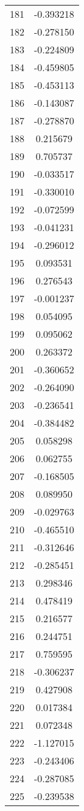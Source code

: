 \documentclass[12pt]{article}
\begin{document}
\begin{longtable}{@{}cc@{}}
181 & -0.393218 \\
182 & -0.278150 \\
183 & -0.224809 \\
184 & -0.459805 \\
185 & -0.453113 \\
186 & -0.143087 \\
187 & -0.278870 \\
188 & 0.215679 \\
189 & 0.705737 \\
190 & -0.033517 \\
191 & -0.330010 \\
192 & -0.072599 \\
193 & -0.041231 \\
194 & -0.296012 \\
195 & 0.093531 \\
196 & 0.276543 \\
197 & -0.001237 \\
198 & 0.054095 \\
199 & 0.095062 \\
200 & 0.263372 \\
201 & -0.360652 \\
202 & -0.264090 \\
203 & -0.236541 \\
204 & -0.384482 \\
205 & 0.058298 \\
206 & 0.062755 \\
207 & -0.168505 \\
208 & 0.089950 \\
209 & -0.029763 \\
210 & -0.465510 \\
211 & -0.312646 \\
212 & -0.285451 \\
213 & 0.298346 \\
214 & 0.478419 \\
215 & 0.216577 \\
216 & 0.244751 \\
217 & 0.759595 \\
218 & -0.306237 \\
219 & 0.427908 \\
220 & 0.017384 \\
221 & 0.072348 \\
222 & -1.127015 \\
223 & -0.243406 \\
224 & -0.287085 \\
225 & -0.239538 \\

\end{longtable}
\end{document}
